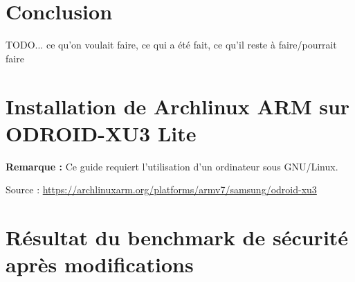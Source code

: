 \documentclass[11pt,a4paper,oneside]{report}
\newcommand{\odroid}{ODROID-XU3 Lite }
\begin{document}
\chapter{Conclusion}
TODO... ce qu'on voulait faire, ce qui a été fait, ce qu'il reste à faire/pourrait faire


\nocite{*} %



\begin{appendices}

\chapter{Installation de Archlinux ARM sur \odroid}\label{install_alarm_odroid}
\textbf{Remarque : }Ce guide requiert l'utilisation d'un ordinateur sous GNU/Linux.

Source : \url{https://archlinuxarm.org/platforms/armv7/samsung/odroid-xu3}




\chapter{Résultat du benchmark de sécurité après modifications}\label{apx-bench-after-modif}

\inputminted[xleftmargin=20pt, linenos=true, breaklines=true, frame=single, framesep=6pt, tabsize=2, fontfamily=courier, fontsize=\small]{text}{../../docker_security_benchmark/after-modifications.log}

\end{appendices}
\end{document}
